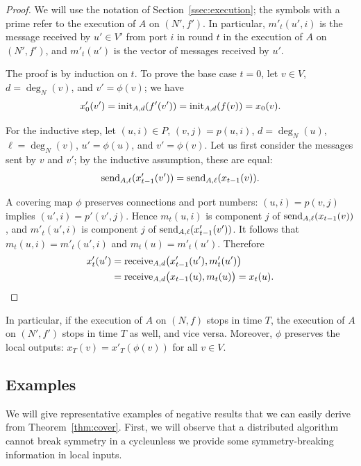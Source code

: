 \begin{proof}
    We will use the notation of Section~\ref{ssec:execution}; the symbols with a prime refer to the execution of $A$ on $(N'\!,f')$. In particular, $m'_t(u',i)$ is the message received by $u' \in V'$ from port $i$ in round $t$ in the execution of $A$ on $(N'\!,f')$, and $m'_t(u')$ is the vector of messages received by $u'$.
    
    The proof is by induction on $t$. To prove the base case $t = 0$, let $v \in V$, $d = \deg_N(v)$, and $v' = \phi(v)$; we have
    \[
        x'_0(v') = \operatorname{init}_{A,d}(f'(v')) = \operatorname{init}_{A,d}(f(v)) = x_0(v).
    \]
    
    For the inductive step, let $(u,i) \in P$, $(v,j) = p(u,i)$, $d = \deg_N(u)$, $\ell = \deg_N(v)$, $u' = \phi(u)$, and $v' = \phi(v)$. Let us first consider the messages sent by $v$ and $v'$; by the inductive assumption, these are equal:
    \[
        \operatorname{send}_{A,\ell}(x'_{t-1}(v')) = \operatorname{send}_{A,\ell}(x_{t-1}(v)).
    \]
    
    A covering map $\phi$ preserves connections and port numbers: $(u,i) = p(v,j)$ implies $(u',i) = p'(v',j)$. Hence $m_t(u,i)$ is component $j$ of $\operatorname{send}_{A,\ell}(x_{t-1}(v))$, and $m'_t(u',i)$ is component $j$ of $\operatorname{send}_{A,\ell}(x'_{t-1}(v'))$. It follows that $m_t(u,i) = m'_t(u',i)$ and $m_t(u) = m'_t(u')$. Therefore
    \begin{align*}
        x'_t(u')
        &= \operatorname{receive}_{A,d}\bigl(x'_{t-1}(u'), m'_t(u') \bigr) \\
        &= \operatorname{receive}_{A,d}\bigl(x_{t-1}(u), m_t(u) \bigr)
        = x_t(u). \qedhere
    \end{align*}
\end{proof}

In particular, if the execution of $A$ on $(N,f)$ stops in time $T$, the execution of $A$ on $(N'\!,f')$ stops in time $T$ as well, and vice versa. Moreover, $\phi$ preserves the local outputs: $x_T(v) = x'_T(\phi(v))$ for all $v \in V$.

\subsection{Examples}

We will give representative examples of negative results that we can easily derive from Theorem~\ref{thm:cover}. First, we will observe that a distributed algorithm cannot break symmetry in a cycle\mydash unless we provide some symmetry-breaking information in local inputs.

